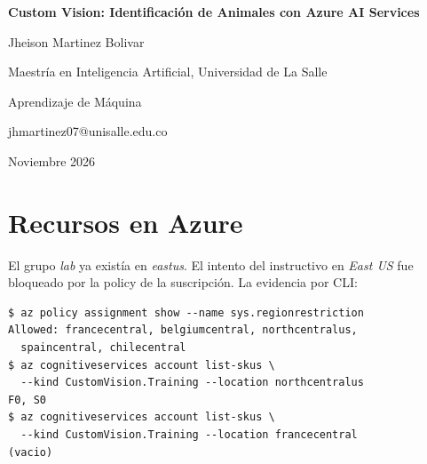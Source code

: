 \documentclass[a4paper,12pt]{article}
\begin{document}
  \begin{center}
    \vspace*{2cm}
    \textbf{Custom Vision: Identificaci\'on de Animales con Azure AI Services}
    \vspace{\baselineskip}

    Jheison Martinez Bolivar

    \vspace{\baselineskip}
    Maestr\'ia en Inteligencia Artificial, Universidad de La Salle

    Aprendizaje de M\'aquina

    jhmartinez07@unisalle.edu.co

    Noviembre 2026
  \end{center}
  \newpage

  \begin{abstract}
    Se construy\'o un clasificador de im\'agenes de elefantes, jirafas y leones con Azure Custom Vision \cite{microsoft_customvision2024} sobre Azure AI Services \cite{microsoft_cognitiveservices2024}. La suscripci\'on Azure for Students impone la policy \textit{sys.regionrestriction} que solo permite \textit{francecentral, belgiumcentral, northcentralus, spaincentral} y \textit{chilecentral}; por ello el instructivo original en \textit{East US} falla con \textit{InvalidTemplateDeployment / RequestDisallowedByAzure}. Verificado por CLI, solo \textit{northcentralus} soporta \textit{CustomVision.Training} y \textit{Prediction}, as\'i que los recursos \textit{labunisalle} y \textit{labunisalle-Prediction} se crearon all\'i en SKU S0. El proyecto \textit{Animal Identification} (Classification, Multiclass, dominio General [A2]) se entren\'o con 17 im\'agenes por clase y Quick Training: Precision, Recall y AP en 100\% sobre entrenamiento. Con 6 im\'agenes nuevas de Wikimedia Commons el modelo publicado acierta 6/6 con confianza media de 96.7\%, con el caso m\'as d\'ebil en una imagen con tres jirafas juntas (87.0\%).
  \end{abstract}

  \section{Recursos en Azure}

  El grupo \textit{lab} ya exist\'ia en \textit{eastus}. El intento del instructivo en \textit{East US} fue bloqueado por la policy de la suscripci\'on. La evidencia por CLI:

  \begin{verbatim}
$ az policy assignment show --name sys.regionrestriction
Allowed: francecentral, belgiumcentral, northcentralus,
  spaincentral, chilecentral
$ az cognitiveservices account list-skus \
  --kind CustomVision.Training --location northcentralus
F0, S0
$ az cognitiveservices account list-skus \
  --kind CustomVision.Training --location francecentral
(vacio)
  \end{verbatim}
\end{document}
